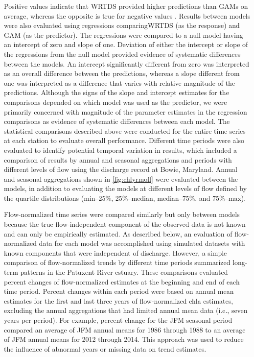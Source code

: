 \documentclass[letterpaper,12pt,oneside]{article}\usepackage[]{graphicx}\usepackage[]{color}
\begin{document}
Positive values indicate that \ac{WRTDS} provided higher predictions than \acp{GAM} on average, whereas the opposite is true for negative values \citep{Moyer12}.  Results between models were also evaluated using regressions comparing\ac{WRTDS} (as the response) and \ac{GAM} (as the predictor).  The regressions were compared to a null model having an intercept of zero and slope of one.  Deviation of either the intercept or slope of the regressions from the null model provided evidence of systematic differences between the models.  An intercept significantly different from zero was interpreted as an overall difference between the predictions, whereas a slope different from one was interpreted as a difference that varies with relative magnitude of the predictions. Although the signs of the slope and intercept estimates for the comparisons depended on which model was used as the predictor, we were primarily concerned with magnitude of the parameter estimates in the regression comparisons as evidence of systematic differences between each model. The statistical comparisons described above were conducted for the entire time series at each station to evaluate overall performance.  Different time periods were also evaluated to identify potential temporal variation in results, which included a comparison of results by annual and seasonal aggregations and periods with different levels of flow using the discharge record at Bowie, Maryland.  Annual and seasonal aggregations shown in \cref{fig:chlyrmofl} were evaluated between the models, in addition to evaluating the models at different levels of flow defined by the quartile distributions (min--25\%, 25\%--median, median--75\%, and 75\%--max).

Flow-normalized time series were compared similarly but only between models because the true flow-independent component of the observed data is not known and can only be empirically estimated.  As described below, an evaluation of flow-normalized data for each model was accomplished using simulated datasets with known components that were independent of discharge.  However, a simple comparison of flow-normalized trends by different time periods summarized long-term patterns in the Patuxent River estuary.  These comparisons evaluated percent changes of flow-normalized estimates at the beginning and end of each time period.  Percent changes within each period were based on annual mean estimates for the first and last three years of flow-normalized \ac{chla} estimates, excluding the annual aggregations that had limited annual mean data (i.e., seven years per period).  For example, percent change for the \ac{JFM} seasonal period compared an average of JFM annual means for 1986 through 1988 to an average of JFM annual means for 2012 through 2014. This approach was used to reduce the influence of abnormal years or missing data on trend estimates.   
\end{document}
